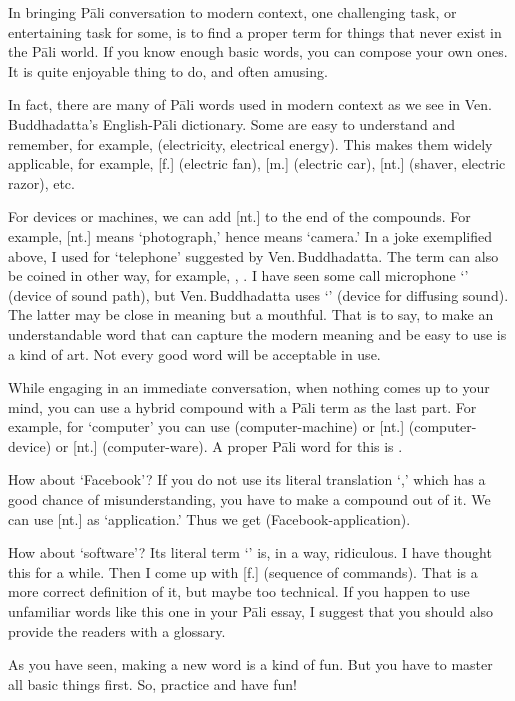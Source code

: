 In bringing P\=ali conversation to modern context, one challenging task, or entertaining task for some, is to find a proper term for things that never exist in the P\=ali world. If you know enough basic words, you can compose your own ones. It is quite enjoyable thing to do, and often amusing.

In fact, there are many of P\=ali words used in modern context as we see in Ven.\,Buddhadatta's English-P\=ali dictionary. Some are easy to understand and remember, for example,  (electricity, electrical energy). This makes them widely applicable, for example,  [f.] (electric fan),  [m.] (electric car),  [nt.] (shaver, electric razor), etc. 

For devices or machines, we can add  [nt.] to the end of the compounds. For example,  [nt.] means `photograph,' hence  means `camera.' In a joke exemplified above, I used  for `telephone' suggested by Ven.\,Buddhadatta. The term can also be coined in other way, for example, , . I have seen some call microphone `' (device of sound path), but Ven.\,Buddhadatta uses `' (device for diffusing sound). The latter may be close in meaning but a mouthful. That is to say, to make an understandable word that can capture the modern meaning and be easy to use is a kind of art. Not every good word will be acceptable in use.

While engaging in an immediate conversation, when nothing comes up to your mind, you can use a hybrid compound with a P\=ali term as the last part. For example, for `computer' you can use  (computer-machine) or  [nt.] (computer-device) or  [nt.] (computer-ware). A proper P\=ali word for this is .

How about `Facebook'? If you do not use its literal translation `,' which has a good chance of misunderstanding, you have to make a compound out of it. We can use  [nt.] as `application.' Thus we get  (Facebook-application).

How about `software'? Its literal term `' is, in a way, ridiculous. I have thought this for a while. Then I come up with  [f.] (sequence of commands). That is a more correct definition of it, but maybe too technical. If you happen to use unfamiliar words like this one in your P\=ali essay, I suggest that you should also provide the readers with a glossary.

As you have seen, making a new word is a kind of fun. But you have to master all basic things first. So, practice and have fun!
